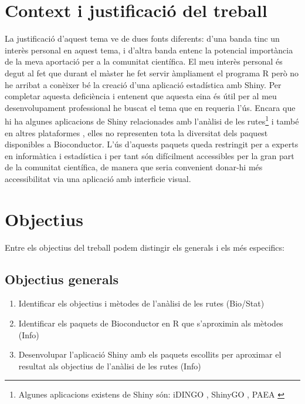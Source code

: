 \section{Context i justificació del treball}
La justificació d'aquest tema ve de dues fonts diferents: d'una banda tinc un interès personal en aquest tema, i d'altra banda entenc la potencial importància de la meva aportació per a la comunitat científica. El meu interès personal és degut al fet que durant el màster he fet servir àmpliament el programa R però no he arribat a conèixer bé la creació d'una aplicació estadística amb Shiny. Per completar aquesta deficiència i entenent que aquesta eina és útil per al meu desenvolupament professional he buscat el tema que en requeria l'ús. Encara que hi ha algunes aplicacions de Shiny relacionades amb l'anàlisi de les rutes\footnote{Algunes aplicacions existens de Shiny són: iDINGO \cite{class2017idingo}, ShinyGO \cite{ge2018shinygo}, PAEA \cite{clark2015principle}} i també en altres plataformes \cite{reimand2019pathway}, elles no representen tota la diversitat dels paquest disponibles a \gls{Bioconductor}. L'ús d'aquests paquets queda restringit per a experts en informàtica i estadística i per tant són difícilment accessibles per la gran part de la comunitat científica, de manera que seria convenient donar-hi més accessibilitat via una aplicació amb interficie visual. 


\section{Objectius}

Entre els objectius del treball podem distingir els generals i els més especifics:
\subsection{Objectius generals}
\begin{enumerate}
\item Identificar els objectius i mètodes de l'anàlisi de les rutes (Bio/Stat)
\item Identificar els paquets de \gls{Bioconductor} en R que s'aproximin als mètodes (Info)
\item Desenvolupar l'aplicació Shiny amb els paquets escollits per aproximar el resultat als objectius de l'anàlisi de les rutes (Info)
\end{enumerate}

